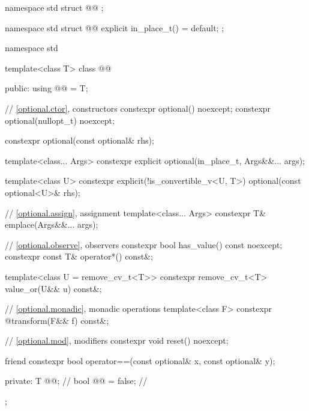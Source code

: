 \begin{codeblock}
namespace std {
  struct @@ {};
}
\end{codeblock}

\begin{codeblock}
namespace std {
  struct @@ {
    explicit in_place_t() = default;
  };
}
\end{codeblock}

\begin{codeblock}
namespace std {
  template<class T>
  class @@ {
  public:
    using @@ = T;

    // \ref{optional.ctor}, constructors
    constexpr optional() noexcept;
    constexpr optional(nullopt_t) noexcept;

    constexpr optional(const optional& rhs);

    template<class... Args> constexpr explicit optional(in_place_t, Args&&... args);

    template<class U>
    constexpr explicit(!is_convertible_v<U, T>) optional(const optional<U>& rhs);

    // \ref{optional.assign}, assignment
    template<class... Args> constexpr T& emplace(Args&&... args);

    // \ref{optional.observe}, observers
    constexpr bool has_value() const noexcept;
    constexpr const T& operator*() const&;

    template<class U = remove_cv_t<T>> constexpr remove_cv_t<T> value_or(U&& u) const&;

    // \ref{optional.monadic}, monadic operations
    template<class F> constexpr @\seebelow@ transform(F&& f) const&;

    // \ref{optional.mod}, modifiers
    constexpr void reset() noexcept;

    friend constexpr bool operator==(const optional& x, const optional& y);

  private:
    T @@;              // \expos
    bool @@ = false; // \expos
  };
}
\end{codeblock}
